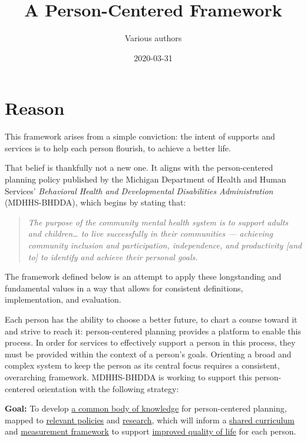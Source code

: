 \documentclass[
]{book}
\title{A Person-Centered Framework}
\author{Various authors}
\date{2020-03-31}
\begin{document}
\maketitle

{
\setcounter{tocdepth}{1}
\tableofcontents
}
\hypertarget{reason}{%
\chapter{Reason}\label{reason}}

This framework arises from a simple conviction: the intent of supports and services is to help each person flourish, to achieve a better life.

That belief is thankfully not a new one. It aligns with the person-centered planning policy\citep{pcp-policy} published by the Michigan Department of Health and Human Services' \emph{Behavioral Health and Developmental Disabilities Administration} (MDHHS-BHDDA), which begins by stating that:

\begin{quote}
\emph{The purpose of the community mental health system is to support adults and children\ldots{} to live successfully in their communities --- achieving community inclusion and participation, independence, and productivity {[}and to{]} to identify and achieve their personal goals.}
\end{quote}

The framework defined below is an attempt to apply these longstanding and fundamental values in a way that allows for consistent definitions, implementation, and evaluation.

Each person has the ability to choose a better future, to chart a course toward it and strive to reach it: person-centered planning provides a platform to enable this process. In order for services to effectively support a person in this process, they must be provided within the context of a person's goals. Orienting a broad and complex system to keep the person as its central focus requires a consistent, overarching framework. MDHHS-BHDDA is working to support this person-centered orientation with the following strategy:

\textbf{Goal:} To develop \protect\hyperlink{bok}{a common body of knowledge} for person-centered planning,
mapped to \protect\hyperlink{policy}{relevant policies} and \protect\hyperlink{research}{research},
which will inform a \protect\hyperlink{curriculum}{shared curriculum}
and \protect\hyperlink{measure}{measurement framework}
to support \protect\hyperlink{pcpdca}{improved quality of life} for each person.
\end{document}
